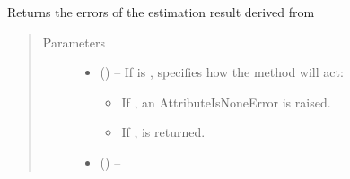 \documentclass[letterpaper,10pt,english]{sphinxmanual}
\begin{document}
\begin{fulllineitems}
\begin{fulllineitems}
\label{\detokenize{references/core:nmrespy.core.Estimator.get_errors}}
\sphinxAtStartPar
Returns the errors of the estimation result derived from
{\hyperref[\detokenize{references/core:nmrespy.core.Estimator.nonlinear_programming}]{}}
\begin{quote}\begin{description}
\item[{Parameters}] \leavevmode\begin{itemize}
\item {} 
\sphinxAtStartPar
{} (\sphinxstyleliteralemphasis{\sphinxupquote{, }}) – 
\sphinxAtStartPar
If  is ,  specifies how the method will
act:
\begin{itemize}
\item {} 
\sphinxAtStartPar
If , an AttributeIsNoneError is raised.

\item {} 
\sphinxAtStartPar
If ,  is returned.

\end{itemize}


\item {} 
\sphinxAtStartPar
{} (\sphinxstyleliteralemphasis{\sphinxupquote{, }}) – 

\end{itemize}

\end{description}\end{quote}

\end{fulllineitems}



\end{fulllineitems}
\end{document}
